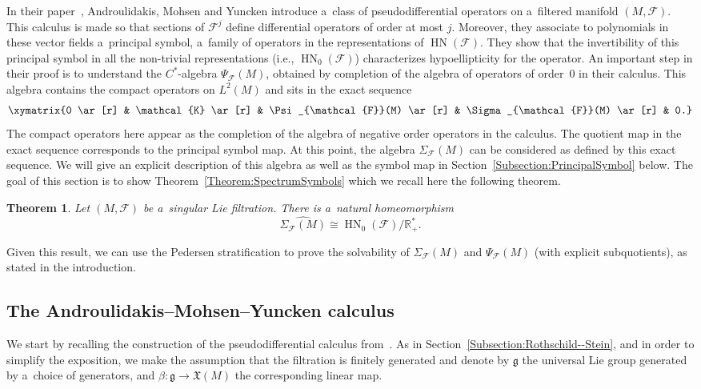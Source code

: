 \documentclass[pdftex]{sigma}
\newcommand{\R}{\mathbb R} %
\newcommand{\F}{\mathcal{F}} %
\newcommand{\g}{\mathfrak{g}} %
\newcommand{\HN}{\operatorname{HN}} %
\newcommand{\Fb}{\mathcal{F}} %
\numberwithin{equation}{section}
\newtheorem{thm}{Theorem}[section]
\theoremstyle{definition}
\begin{document}
In their paper~\cite{AMYMaximalHypoellipticity}, Androulidakis, Mohsen and Yuncken introduce a~class of pseudodifferential operators on a~filtered manifold $(M,\Fb)$. This calculus is made so that sections of $\F^j$ define differential operators of order at most $j$. Moreover, they associate to polynomials in these vector fields a~principal symbol, a~family of operators in the representations of $\HN(\Fb)$. They show that the invertibility of this principal symbol in all the non-trivial representations (i.e., $\HN_0(\Fb)$) characterizes hypoellipticity for the operator. An important step in their proof is to understand the $C^*$-algebra $\Psi_{\Fb}(M)$, obtained by completion of the algebra of operators of order~$0$ in their calculus. This algebra contains the compact operators on $L^2(M)$ and sits in the exact sequence
\begin{equation}\label{Equation:PseudosExactSequence}
 \xymatrix{0 \ar[r] & \mathcal{K} \ar[r] & \Psi_{\Fb}(M) \ar[r] & \Sigma_{\Fb}(M) \ar[r] & 0.}
\end{equation}
The compact operators here appear as the completion of the algebra of negative order operators in the calculus. The quotient map in the exact sequence corresponds to the principal symbol map. At this point, the algebra $\Sigma_{\Fb}(M)$ can be considered as defined by this exact sequence. We will give an explicit description of this algebra as well as the symbol map in Section~\ref{Subsection:PrincipalSymbol} below. The goal of this section is to show Theorem~\ref{Theorem:SpectrumSymbols} which we recall here the following theorem.

\begin{thm}
 Let $(M,\Fb)$ be a~singular Lie filtration. There is a~natural homeomorphism
 \[\widehat{\Sigma_{\Fb}(M)} \cong {\HN_0(\Fb)}/{\R^*_+}.\]
\end{thm}

Given this result, we can use the Pedersen stratification to prove the solvability of $\Sigma_{\Fb}(M)$ and $\Psi_{\Fb}(M)$ (with explicit subquotients), as stated in the introduction.

\subsection{The Androulidakis--Mohsen--Yuncken calculus}

We start by recalling the construction of the pseudodifferential calculus from~\cite{AMYMaximalHypoellipticity}. As in Section~\ref{Subsection:Rothschild--Stein}, and in order to simplify the exposition, we make the assumption that the filtration is finitely generated and denote by $\g$ the universal Lie group generated by a~choice of generators, and $\beta \colon \g \to \mathfrak{X}(M)$ the corresponding linear map.
\end{document}
